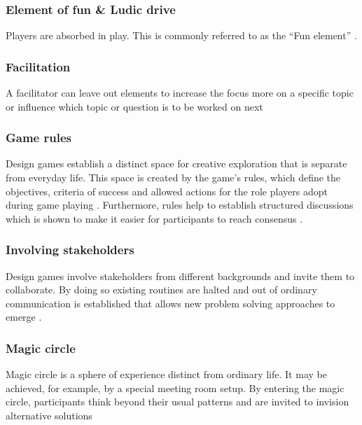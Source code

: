 \documentclass[draft,twoside]{vutinfth}
\begin{document}
            \subsubsection{Element of fun \& Ludic drive}
            Players are absorbed in play. This is commonly referred to as the ``Fun element'' \cite{brandtDesigningExploratoryDesign2006}. 

            \subsubsection{Facilitation}
            A facilitator can leave out elements to increase the focus more on a specific topic or influence 
            which topic or question is to be worked on next \cite{kjaersgaardDesignGamesFieldwork2021}

            \subsubsection{Game rules}
            Design games establish a distinct space for creative exploration that is separate from everyday life. This space 
            is created by the game's rules, which define the objectives, criteria of success and allowed actions for the role 
            players adopt during game playing \cite{fikarGroundedTheoryZur2023}. 
            Furthermore, rules help to establish structured discussions which is shown to make it easier for participants 
            to reach consensus \cite{zhangAddressingCulturalInertias2024}. 

            \subsubsection{Involving stakeholders}
            Design games involve stakeholders from different backgrounds and invite them to collaborate. By doing so 
            existing routines are halted and out of ordinary communication is established that allows new problem solving 
            approaches to emerge \cite{fikarGroundedTheoryZur2023}. 

            \subsubsection{Magic circle}
            Magic circle is a sphere of experience distinct from ordinary life. It may be achieved, for 
            example, by a special meeting room setup. By entering the magic circle, participants think beyond their 
            usual patterns and are invited to invision alternative solutions \cite{vaajakallioDesignGamesCodesign2014,fikarGroundedTheoryZur2023}
\end{document}
